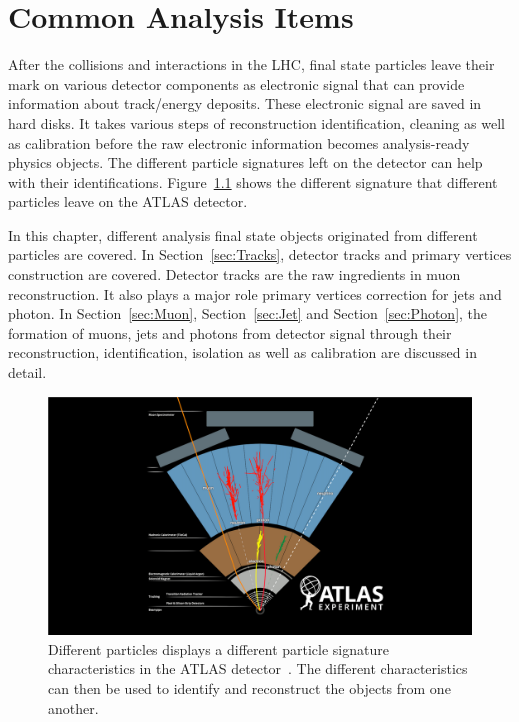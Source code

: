 \chapter{Common Analysis Items}
\label{chapter:common_analysis_objects}

After the collisions and interactions in the LHC, final state particles leave their mark on various detector components as electronic signal that can provide information about track/energy deposits. These electronic signal are saved in hard disks. It takes various steps of reconstruction identification, cleaning as well as calibration before the raw electronic information becomes analysis-ready physics objects. The different particle signatures left on the detector can help
with their identifications. Figure~\ref{fig:particleSignature} shows the different signature that different particles leave on the ATLAS detector.

In this chapter, different analysis final state objects originated from different particles are covered. In Section~\ref{sec:Tracks}, detector tracks and primary vertices construction are covered. Detector tracks are the raw ingredients in muon reconstruction. It also plays a major role primary vertices correction for jets and photon. In Section~\ref{sec:Muon}, Section~\ref{sec:Jet} and Section~\ref{sec:Photon}, the formation of muons, jets and photons from detector signal
through their reconstruction, identification, isolation as well as calibration are discussed in detail. 

\begin{figure}[!htb]
    \begin{center}
        \includegraphics[width=1.1\textwidth]{figures/common_ana/ParticleSignature}
        \caption{        
            Different particles displays a different particle signature characteristics in the ATLAS detector~\cite{Mehlhase:2770815}. The different characteristics can then be used to identify and reconstruct the objects from one another. 
        }
        \label{fig:particleSignature}
    \end{center}
\end{figure}

